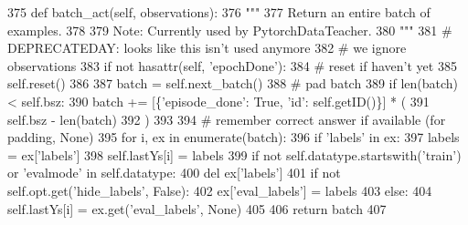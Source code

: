 \begin{DoxyCode}
375     \textcolor{keyword}{def }batch\_act(self, observations):
376         \textcolor{stringliteral}{"""}
377 \textcolor{stringliteral}{        Return an entire batch of examples.}
378 \textcolor{stringliteral}{}
379 \textcolor{stringliteral}{        Note: Currently used by PytorchDataTeacher.}
380 \textcolor{stringliteral}{        """}
381         \textcolor{comment}{# DEPRECATEDAY: looks like this isn't used anymore}
382         \textcolor{comment}{# we ignore observations}
383         \textcolor{keywordflow}{if} \textcolor{keywordflow}{not} hasattr(self, \textcolor{stringliteral}{'epochDone'}):
384             \textcolor{comment}{# reset if haven't yet}
385             self.reset()
386 
387         batch = self.next\_batch()
388         \textcolor{comment}{# pad batch}
389         \textcolor{keywordflow}{if} len(batch) < self.bsz:
390             batch += [\{\textcolor{stringliteral}{'episode\_done'}: \textcolor{keyword}{True}, \textcolor{stringliteral}{'id'}: self.getID()\}] * (
391                 self.bsz - len(batch)
392             )
393 
394         \textcolor{comment}{# remember correct answer if available (for padding, None)}
395         \textcolor{keywordflow}{for} i, ex \textcolor{keywordflow}{in} enumerate(batch):
396             \textcolor{keywordflow}{if} \textcolor{stringliteral}{'labels'} \textcolor{keywordflow}{in} ex:
397                 labels = ex[\textcolor{stringliteral}{'labels'}]
398                 self.lastYs[i] = labels
399                 \textcolor{keywordflow}{if} \textcolor{keywordflow}{not} self.datatype.startswith(\textcolor{stringliteral}{'train'}) \textcolor{keywordflow}{or} \textcolor{stringliteral}{'evalmode'} \textcolor{keywordflow}{in} self.datatype:
400                     del ex[\textcolor{stringliteral}{'labels'}]
401                     \textcolor{keywordflow}{if} \textcolor{keywordflow}{not} self.opt.get(\textcolor{stringliteral}{'hide\_labels'}, \textcolor{keyword}{False}):
402                         ex[\textcolor{stringliteral}{'eval\_labels'}] = labels
403             \textcolor{keywordflow}{else}:
404                 self.lastYs[i] = ex.get(\textcolor{stringliteral}{'eval\_labels'}, \textcolor{keywordtype}{None})
405 
406         \textcolor{keywordflow}{return} batch
407 
\end{DoxyCode}
\mbox{\label{classparlai_1_1core_1_1teachers_1_1FixedDialogTeacher_a7c4cbfbe5cf6e9dbdf8c00d140ef4e7e}} 
